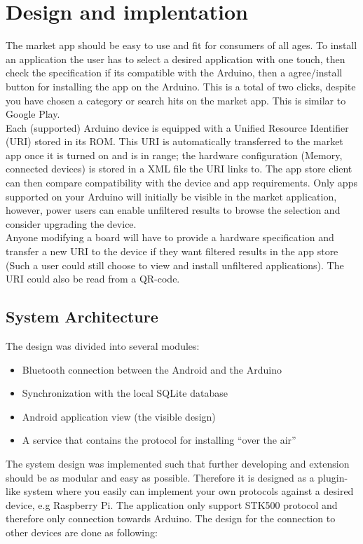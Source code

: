 \chapter{Design and implentation}
The market app should be easy to use and fit for consumers of all ages. To install an application the user has to select a desired application with one touch, then check the specification if its compatible with the Arduino, then a agree/install button for installing the app on the Arduino. This is a total of two clicks, despite you have chosen a category or search hits on the market app. This is similar to Google Play.\\
\newline
Each (supported) Arduino device is equipped with a Unified Resource Identifier (URI) stored in its ROM. This URI is automatically transferred to the market app once it is turned on and is in range; the hardware configuration (Memory, connected devices) is stored in a XML file the URI links to.
The app store client can then compare compatibility with the device and app requirements.
Only apps supported on your Arduino will initially be visible in the market application, however, power users can enable unfiltered results to browse the selection and consider upgrading the device.\\
\newline
Anyone modifying a board will have to provide a hardware specification and transfer a new URI to the device if they want filtered results in the app store (Such a user could still choose to view and install unfiltered applications).
The URI could also be read from a QR-code.

\section{System Architecture}
	The design was divided into several modules:
	\begin{itemize}
		\item{Bluetooth connection between the Android and the Arduino}
		\item{Synchronization with the local SQLite database}
		\item{Android application view (the visible design)}
		\item{A service that contains the protocol for installing ``over the air''}
	\end{itemize}

	The system design was implemented such that further developing and extension should be as modular and easy as possible.
	Therefore it is designed as a plugin-like system where you easily can implement your own protocols against a desired device, e.g Raspberry Pi. The application only support STK500 protocol and therefore only connection towards Arduino.
	The design for the connection to other devices are done as following:\\


